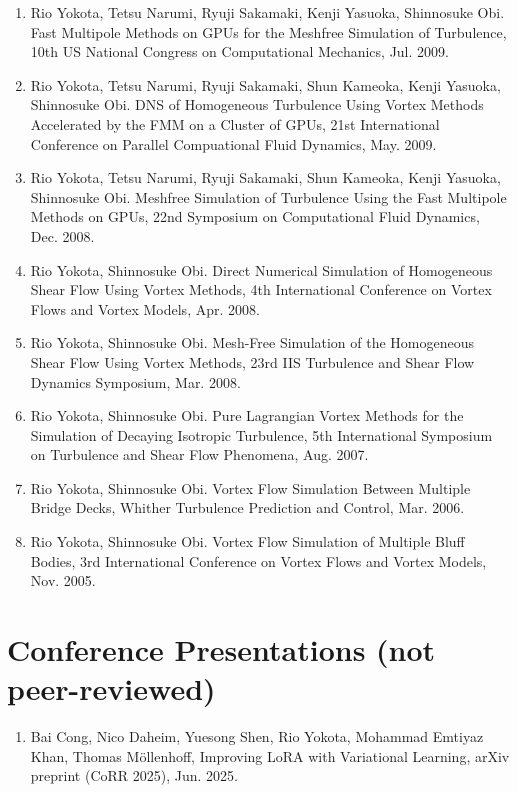 \documentclass[margin,line]{cv}
\begin{document}
\begin{resume}
\begin{enumerate}
\item Rio Yokota, Tetsu Narumi, Ryuji Sakamaki, Kenji Yasuoka, Shinnosuke Obi. Fast Multipole Methods on GPUs for the Meshfree Simulation of Turbulence, 10th US National Congress on Computational Mechanics, Jul. 2009.

\item Rio Yokota, Tetsu Narumi, Ryuji Sakamaki, Shun Kameoka, Kenji Yasuoka, Shinnosuke Obi. DNS of Homogeneous Turbulence Using Vortex Methods Accelerated by the FMM on a Cluster of GPUs, 21st International Conference on Parallel Compuational Fluid Dynamics, May. 2009.

\item Rio Yokota, Tetsu Narumi, Ryuji Sakamaki, Shun Kameoka, Kenji Yasuoka, Shinnosuke Obi. Meshfree Simulation of Turbulence Using the Fast Multipole Methods on GPUs, 22nd Symposium on Computational Fluid Dynamics, Dec. 2008.

\item Rio Yokota, Shinnosuke Obi. Direct Numerical Simulation of Homogeneous Shear Flow Using Vortex Methods, 4th International Conference on Vortex Flows and Vortex Models, Apr. 2008.

\item Rio Yokota, Shinnosuke Obi. Mesh-Free Simulation of the Homogeneous Shear Flow Using Vortex Methods, 23rd IIS Turbulence and Shear Flow Dynamics Symposium, Mar. 2008.

\item Rio Yokota, Shinnosuke Obi. Pure Lagrangian Vortex Methods for the Simulation of Decaying Isotropic Turbulence, 5th International Symposium on Turbulence and Shear Flow Phenomena, Aug. 2007.

\item Rio Yokota, Shinnosuke Obi. Vortex Flow Simulation Between Multiple Bridge Decks, Whither Turbulence Prediction and Control, Mar. 2006.

\item Rio Yokota, Shinnosuke Obi. Vortex Flow Simulation of Multiple Bluff Bodies, 3rd International Conference on Vortex Flows and Vortex Models, Nov. 2005.
\end{enumerate}

\section{\sc Conference Presentations (not peer-reviewed)}
\begin{enumerate}
\item Bai Cong, Nico Daheim, Yuesong Shen, Rio Yokota, Mohammad Emtiyaz Khan, Thomas M\"{o}llenhoff, Improving LoRA with Variational Learning, arXiv preprint (CoRR 2025), Jun. 2025.


\end{enumerate}
\end{resume}
\end{document}
